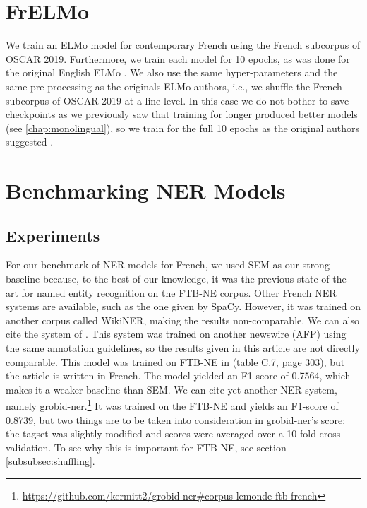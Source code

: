 \section{FrELMo}

We train an ELMo model for contemporary French using the French subcorpus of OSCAR 2019. Furthermore, we train each model for 10 epochs, as was done for the original English ELMo \citep{peters-etal-2018-deep}. We also use the same hyper-parameters and the same pre-processing as the originals ELMo authors, i.e., we shuffle the French subcorpus of OSCAR 2019 at a line level. In this case we do not bother to save checkpoints as we previously saw that training for longer produced better models (see \ref{chap:monolingual}), so we train for the full 10 epochs as the original authors suggested \citep{peters-etal-2018-deep}.

\section{Benchmarking NER Models}

\subsection{Experiments}
For our benchmark of NER models for French, we used SEM \citep{dupont-2017-exploration} as our strong baseline because, to the best of our knowledge, it was the previous state-of-the-art for named entity recognition on the FTB-NE corpus. Other French NER systems are available, such as the one given by SpaCy. However, it was trained on another corpus called WikiNER, making the results non-comparable. We can also cite the system of \citep{stern-etal-2012-joint}. This system was trained on another newswire (AFP) using the same annotation guidelines, so the results given in this article are not directly comparable. This model was trained on FTB-NE in \citet{stern-2013-identification} (table C.7, page 303), but the article is written in French. The model yielded an F1-score of 0.7564, which makes it a weaker baseline than SEM. We can cite yet another NER system, namely grobid-ner.\footnote{\url{https://github.com/kermitt2/grobid-ner\#corpus-lemonde-ftb-french}} It was trained on the FTB-NE and yields an F1-score of 0.8739, but two things are to be taken into consideration in grobid-ner's score: the tagset was slightly modified and scores were averaged over a 10-fold cross validation. To see why this is important for FTB-NE, see section \ref{subsubsec:shuffling}.


